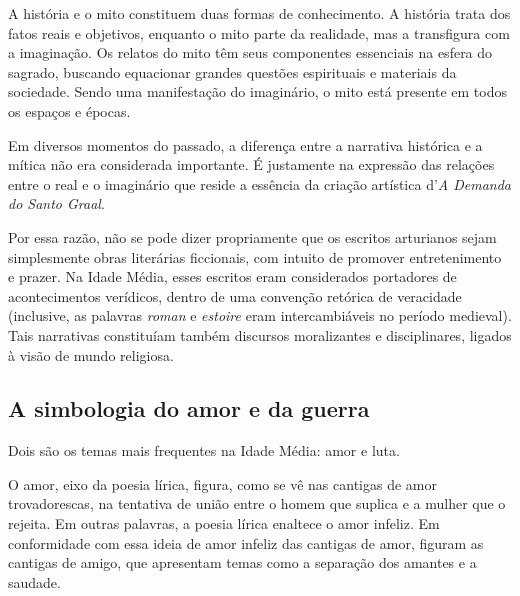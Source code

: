 \documentclass[11pt]{extarticle}
\begin{document}
A história e o mito constituem duas formas de conhecimento. A
história trata dos fatos reais e objetivos, enquanto o mito parte da
realidade, mas a transfigura com a imaginação. Os relatos do mito têm
seus componentes essenciais na esfera do sagrado, buscando equacionar
grandes questões espirituais e materiais da sociedade. Sendo uma
manifestação do imaginário, o mito está presente em todos os espaços e
épocas.




Em diversos momentos do passado, a diferença
entre a narrativa histórica e a mítica não era considerada importante. É
justamente na expressão das relações entre o real e o imaginário que
reside a essência da criação artística d'\emph{A Demanda do Santo
Graal}.

Por essa razão, não se pode dizer propriamente
que os escritos arturianos sejam simplesmente obras literárias
ficcionais, com intuito de promover entretenimento e prazer. Na Idade
Média, esses escritos eram considerados portadores de acontecimentos
verídicos, dentro de uma convenção retórica de veracidade (inclusive, as
palavras \emph{roman} e \emph{estoire} eram intercambiáveis no período
medieval). Tais narrativas constituíam também discursos moralizantes e
disciplinares, ligados à visão de mundo
religiosa.






\subsection{A simbologia do amor e da guerra}

Dois são os temas mais frequentes na Idade Média: amor e luta.

O amor, eixo da poesia lírica, figura, como se vê nas cantigas
de amor trovadorescas, na tentativa de união entre o homem que suplica e
a mulher que o rejeita. Em outras palavras, a poesia lírica enaltece o
amor infeliz. Em conformidade com essa ideia de amor infeliz das
cantigas de amor, figuram as cantigas de amigo, que apresentam temas
como a separação dos amantes e a
saudade.
\end{document}
